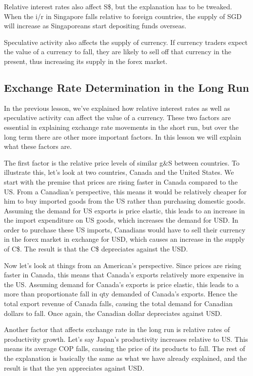 \documentclass[DIV=calc,11pt,parskip,numbers=noenddot]{scrartcl} %
\begin{document}
Relative interest rates also affect S\$, but the explanation has to be tweaked.  When the i/r in Singapore falls relative to foreign countries, the supply of SGD will increase as Singaporeans start depositing funds overseas.

Speculative activity also affects the supply of currency. If currency traders expect the value of a currency to fall, they are likely to sell off that currency in the present, thus increasing its supply in the forex market.
\subsection{Exchange Rate Determination in the Long Run}
In the previous lesson, we’ve explained how relative interest rates as well as speculative activity can affect the value of a currency. These two factors are essential in explaining exchange rate movements in the short run, but over the long term there are other more important factors. In this lesson we will explain what these factors are.

The first factor is the relative price levels of similar g\&S between countries. To illustrate this, let’s look at two countries, Canada and the United States. We start with the premise that prices are rising faster in Canada compared to the US. From a Canadian’s perspective, this means it would be relatively cheaper for him to buy imported goods from the US rather than purchasing domestic goods. Assuming the demand for US exports is price elastic, this leads to an increase in the import expenditure on US goods, which increases the demand for USD. In order to purchase these US imports, Canadians would have to sell their currency in the forex market in exchange for USD, which causes an increase in the supply of C\$. The result is that the C\$ depreciates against the USD.

Now let’s look at things from an American’s perspective. Since prices are rising faster in Canada, this means that Canada’s exports relatively more expensive in the US. Assuming demand for Canada’s exports is price elastic, this leads to a more than proportionate fall in qty demanded of Canada’s exports. Hence the total export revenue of Canada falls, causing the total demand for Canadian dollars to fall. Once again, the Canadian dollar depreciates against USD.

Another factor that affects exchange rate in the long run is relative rates of productivity growth. Let’s say Japan’s productivity increases relative to US. This means its average COP falls, causing the price of its products to fall. The rest of the explanation is basically the same as what we have already explained, and the result is that the yen appreciates against USD.
\end{document}
